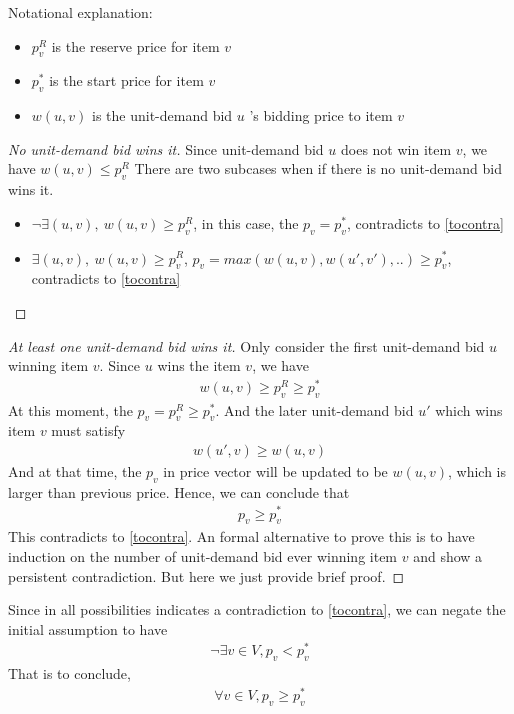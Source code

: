 \documentclass[11pt,a4paper]{article}
\begin{document}
\noindent
    Notational explanation:
\begin{itemize}
    \item{$p_{v}^{R}$ is the reserve price for item $v$}
    \item{$p_{v}^{*}$ is the start price for item $v$}
    \item{$w(u,v)$ is the unit-demand bid $u$ 's bidding price to item $v$}
\end{itemize}

\begin{proof}[No unit-demand bid wins it]
    Since unit-demand bid $u$ does not win item $v$, we have 
    $ w(u,v) \leq p_{v}^{R}$
    There are two subcases when if there is no unit-demand bid wins it. 
    \begin{itemize}
        \item{$\neg \exists (u,v),\ w(u,v) \geq p_{v}^{R}$, in this case, the
                $p_v = p_{v}^{*}$, contradicts to \eqref{tocontra}}   
        \item{$\exists (u,v),\ w(u,v) \geq p_{v}^{R}$, $p_v = max(w(u,v),
                w(u',v'), ..) \geq p_{v}^{*}$, contradicts to \eqref{tocontra}}
    \end{itemize}
\end{proof}

\begin{proof}[At least one unit-demand bid wins it]
    Only consider the first unit-demand bid $u$ winning item $v$. Since $u$
    wins the item $v$, we have 
    \begin{align}
        w(u,v) \geq p_{v}^{R} \geq p_{v}^{*}
    \end{align}
    At this moment, the $p_{v} = p_{v}^{R} \geq p_{v}^{*}$. And the later
    unit-demand bid $u'$ which wins item $v$ must satisfy
    \begin{align}
        w(u',v) \geq w(u,v) 
    \end{align}
    And at that time, the $p_v$ in price vector will be updated to be
    $w(u,v)$, which is larger than previous price. Hence, we can conclude that 
    \begin{align}
        p_v \geq p_{v}^{*}
        \end{align}
    This contradicts to \eqref{tocontra}.
    An formal alternative to prove this is to have induction on the number of
    unit-demand bid ever winning item $v$ and show a persistent contradiction.
    But here we just provide brief proof. 
\end{proof}
\noindent
Since in all possibilities indicates a contradiction to \eqref{tocontra}, we
can negate the initial assumption to have
\begin{align} \label{tonegate}
    \neg \exists v \in V,  p_v < p^*_v 
\end{align}
That is to conclude, 
\begin{align} \label{tonegate}
    \forall v \in V,  p_v \geq p^*_v 
\end{align}
\end{document}
